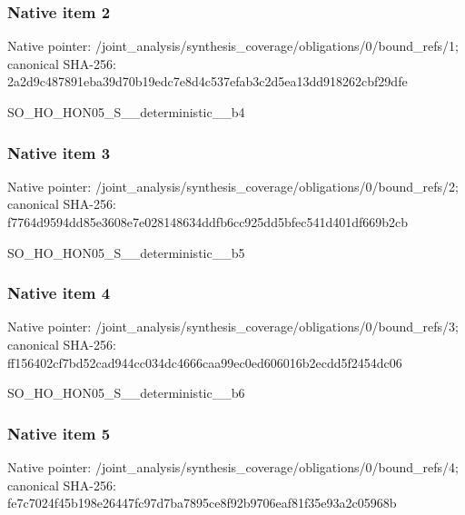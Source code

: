 \documentclass[10pt,a4paper]{article}
\begin{document}
\subsubsection{Native item 2}
Native pointer: /joint\_\allowbreak{}analysis/synthesis\_\allowbreak{}coverage/obligations/0/bound\_\allowbreak{}refs/1; canonical SHA-256: 2a2d9c487891eba39d70b19edc7e8d4c537efab3c2d5ea13dd918262cbf29dfe

\begingroup\raggedright\sloppy SO\_\allowbreak{}HO\_\allowbreak{}HON05\_\allowbreak{}S\_\allowbreak{}\_\allowbreak{}deterministic\_\allowbreak{}\_\allowbreak{}b4\par\endgroup

\subsubsection{Native item 3}
Native pointer: /joint\_\allowbreak{}analysis/synthesis\_\allowbreak{}coverage/obligations/0/bound\_\allowbreak{}refs/2; canonical SHA-256: f7764d9594dd85e3608e7e028148634ddfb6cc925dd5bfec541d401df669b2cb

\begingroup\raggedright\sloppy SO\_\allowbreak{}HO\_\allowbreak{}HON05\_\allowbreak{}S\_\allowbreak{}\_\allowbreak{}deterministic\_\allowbreak{}\_\allowbreak{}b5\par\endgroup

\subsubsection{Native item 4}
Native pointer: /joint\_\allowbreak{}analysis/synthesis\_\allowbreak{}coverage/obligations/0/bound\_\allowbreak{}refs/3; canonical SHA-256: ff156402cf7bd52cad944cc034dc4666caa99ec0ed606016b2ecdd5f2454dc06

\begingroup\raggedright\sloppy SO\_\allowbreak{}HO\_\allowbreak{}HON05\_\allowbreak{}S\_\allowbreak{}\_\allowbreak{}deterministic\_\allowbreak{}\_\allowbreak{}b6\par\endgroup

\subsubsection{Native item 5}
Native pointer: /joint\_\allowbreak{}analysis/synthesis\_\allowbreak{}coverage/obligations/0/bound\_\allowbreak{}refs/4; canonical SHA-256: fe7c7024f45b198e26447fc97d7ba7895ce8f92b9706eaf81f35e93a2c05968b
\end{document}
